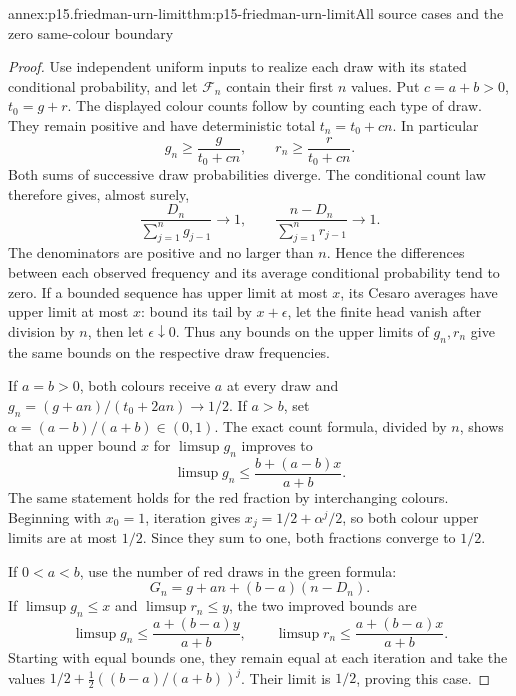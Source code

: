 \begin{annexitem}{annex:p15.friedman-urn-limit}{thm:p15-friedman-urn-limit}{All source cases and the zero same-colour boundary}
\begin{proof}
Use independent uniform inputs to realize each draw with its stated
conditional probability, and let \(\mathcal F_n\) contain their
first \(n\) values. Put \(c=a+b>0\), \(t_0=g+r\).
The displayed colour counts follow by counting each type of draw.
They remain positive and have deterministic total \(t_n=t_0+cn\).
In particular
\[
                           g_n\geq\frac g{t_0+cn},\qquad
                           r_n\geq\frac r{t_0+cn}.
\]
Both sums of successive draw probabilities diverge.
The conditional count law therefore gives, almost surely,
\[
 \frac{D_n}{\sum_{j=1}^ng_{j-1}}\longrightarrow1,\qquad
 \frac{n-D_n}{\sum_{j=1}^nr_{j-1}}\longrightarrow1.
\]
The denominators are positive and no larger than \(n\).
Hence the differences between each observed frequency and
its average conditional probability tend to zero.
If a bounded sequence has upper limit at most \(x\), its
Cesaro averages have upper limit at most \(x\): bound its
tail by \(x+\epsilon\), let the finite head vanish after division
by \(n\), then let \(\epsilon\downarrow0\).
Thus any bounds on the upper limits of \(g_n,r_n\) give the
same bounds on the respective draw frequencies.

If \(a=b>0\), both colours receive \(a\) at every draw and
\(g_n=(g+an)/(t_0+2an)\to1/2\).
If \(a>b\), set \(\alpha=(a-b)/(a+b)\in(0,1)\).
The exact count formula, divided by \(n\), shows that an upper
bound \(x\) for \(\limsup g_n\) improves to
\[
                      \limsup g_n\leq\frac{b+(a-b)x}{a+b}.
\]
The same statement holds for the red fraction by interchanging colours.
Beginning with \(x_0=1\), iteration gives
\(x_j=1/2+\alpha^j/2\), so both colour upper limits are at most
\(1/2\). Since they sum to one, both fractions converge to \(1/2\).

If \(0<a<b\), use the number of red draws in the green formula:
\[
                G_n=g+an+(b-a)(n-D_n).
\]
If \(\limsup g_n\leq x\) and \(\limsup r_n\leq y\), the two
improved bounds are
\[
          \limsup g_n\leq\frac{a+(b-a)y}{a+b},\qquad
          \limsup r_n\leq\frac{a+(b-a)x}{a+b}.
\]
Starting with equal bounds one, they remain equal at each
iteration and take the values
\(1/2+\frac12((b-a)/(a+b))^j\).
Their limit is \(1/2\), proving this case.


\end{proof}
\end{annexitem}
